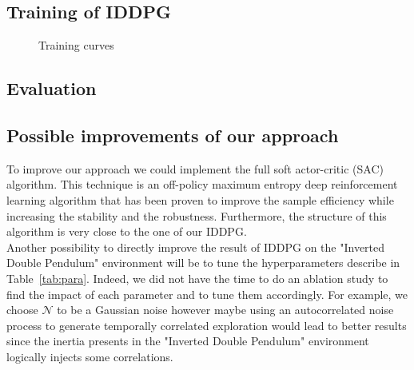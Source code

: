 \subsection{Training of IDDPG}


\begin{figure}[H]
    \centering
    \caption{Training curves}
    \label{fig:training_IDDPG}
\end{figure}


\subsection{Evaluation}

\subsection{Possible improvements of our approach}

To improve our approach we could implement the full soft actor-critic (SAC) \cite{sac} algorithm. This technique is an off-policy maximum entropy deep reinforcement learning algorithm that has been proven to improve the sample efficiency while increasing the stability and the robustness. Furthermore, the structure of this algorithm is very close to the one of our IDDPG. \\

Another possibility to directly improve the result of IDDPG on the "Inverted Double Pendulum" environment will be to tune the hyperparameters describe in Table~\ref{tab:para}. Indeed, we did not have the time to do an ablation study to find the impact of each parameter and to tune them accordingly. For example, we choose $\mathcal{N}$ to be a Gaussian noise however maybe using an autocorrelated noise \cite{autocorrelated} process to generate temporally correlated
exploration would lead to better results since the inertia presents in the "Inverted Double Pendulum" environment logically injects some correlations. 

\vfill



